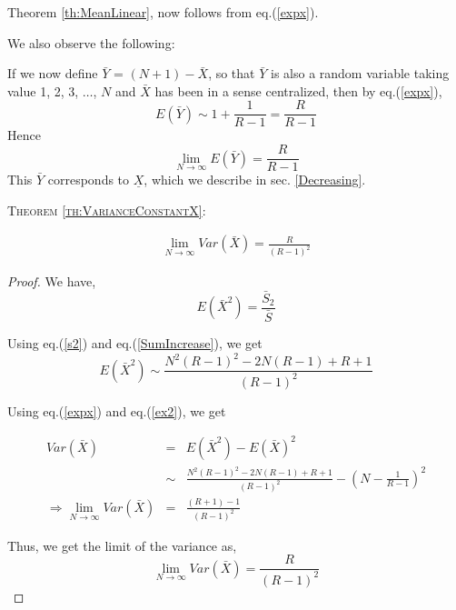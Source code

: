 \begin{multicols}{2}
Theorem \ref{th:MeanLinear}, now follows from eq.(\ref{expx}).

We also observe the following: 

 If we now define $\bar Y$ = $(N+1)- \bar{X}$, so that $\bar{Y}$ is also a random variable taking value 1, 2, 3, $\ldots$, $N$ and $\bar{X}$ has been in a sense centralized, then by eq.(\ref{expx}),
 \begin{equation*}
 E(\bar{Y}) \sim 1 + \frac{1}{R-1} = \frac{R}{R-1}
 \end{equation*}
Hence 
\begin{equation*}
\displaystyle{\lim_{N \rightarrow \infty}} E(\bar{Y}) = \frac{R}{R-1} 
\end{equation*}
This $\bar{Y}$ corresponds to $\underline{X}$, which we describe in sec. \ref{Decreasing}.

\textsc{Theorem {\ref{th:VarianceConstantX}}:}

\begin{eqnarray*}
\lim_{N \rightarrow \infty} Var(\bar{X}) = \frac{R}{(R -1)^2}
\end{eqnarray*}

\begin{proof}\renewcommand{\qedsymbol}{}
We have,
\begin{equation}
E(\bar{X}^2) = \frac{\bar{S}_2}{\bar{S}}\label{eq-6.3}
\end{equation}

Using eq.(\ref{s2}) and eq.(\ref{SumIncrease}), we get
\begin{equation}
E(\bar{X}^2) \sim \frac{N^2(R-1)^2 - 2N(R-1) + R+1}{(R-1)^2}\label{eq-6.4}
\end{equation}

Using eq.(\ref{expx}) and eq.(\ref{ex2}), we get

{\fontsize{6.8}{7.8}\selectfont\begin{eqnarray}
Var(\bar{X})&=& E(\bar{X}^2)-E(\bar{X})^2\nonumber \\
&\sim &\frac{N^2(R-1)^2 - 2N(R-1) + R+1}{(R-1)^2}-\left(N - \frac{1}{R-1}\right)^2\nonumber\\
\Rightarrow \lim_{N \rightarrow \infty}Var(\bar{X})& = & \frac{(R+1)-1}{(R-1)^2}\nonumber
\end{eqnarray}}

Thus, we get the limit of the variance as,
\begin{equation}
\lim_{N \rightarrow \infty}Var(\bar{X}) = \frac{R}{(R-1)^2}\label{eq-6.5}
\end{equation}
\end{proof}


\end{multicols}
